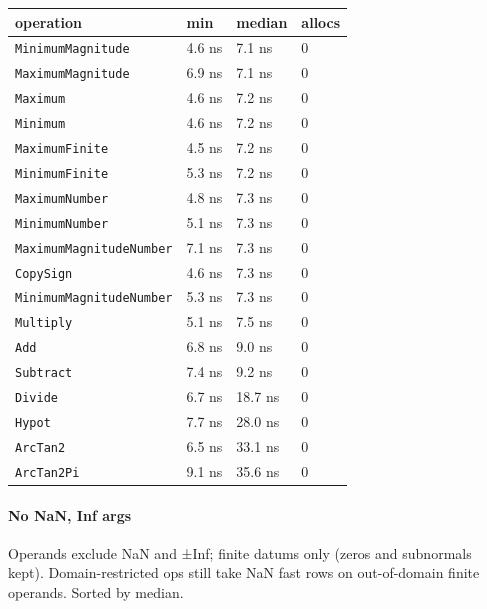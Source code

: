 \begin{table}[h]
\centering
\begin{tabulary}{\linewidth}{L L L L}
\toprule
operation & min & median & allocs \\
\toprule
\texttt{MinimumMagnitude} & 4.6 ns & 7.1 ns & 0 \\
\texttt{MaximumMagnitude} & 6.9 ns & 7.1 ns & 0 \\
\texttt{Maximum} & 4.6 ns & 7.2 ns & 0 \\
\texttt{Minimum} & 4.6 ns & 7.2 ns & 0 \\
\texttt{MaximumFinite} & 4.5 ns & 7.2 ns & 0 \\
\texttt{MinimumFinite} & 5.3 ns & 7.2 ns & 0 \\
\texttt{MaximumNumber} & 4.8 ns & 7.3 ns & 0 \\
\texttt{MinimumNumber} & 5.1 ns & 7.3 ns & 0 \\
\texttt{MaximumMagnitudeNumber} & 7.1 ns & 7.3 ns & 0 \\
\texttt{CopySign} & 4.6 ns & 7.3 ns & 0 \\
\texttt{MinimumMagnitudeNumber} & 5.3 ns & 7.3 ns & 0 \\
\texttt{Multiply} & 5.1 ns & 7.5 ns & 0 \\
\texttt{Add} & 6.8 ns & 9.0 ns & 0 \\
\texttt{Subtract} & 7.4 ns & 9.2 ns & 0 \\
\texttt{Divide} & 6.7 ns & 18.7 ns & 0 \\
\texttt{Hypot} & 7.7 ns & 28.0 ns & 0 \\
\texttt{ArcTan2} & 6.5 ns & 33.1 ns & 0 \\
\texttt{ArcTan2Pi} & 9.1 ns & 35.6 ns & 0 \\
\bottomrule
\end{tabulary}

\end{table}



\paragraph{No NaN, Inf args}\indent



\label{9842352165407780921}{}


Operands exclude NaN and ±Inf; finite datums only (zeros and subnormals kept). Domain-restricted ops still take NaN fast rows on out-of-domain finite operands. Sorted by median.





